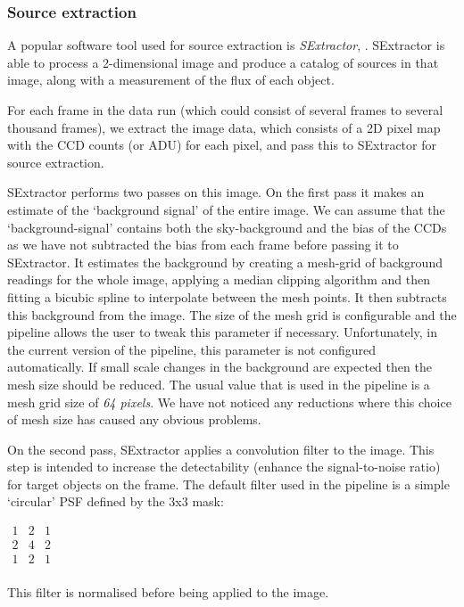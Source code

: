 \subsubsection{Source extraction}
A popular software tool used for source extraction is \emph{SExtractor}, \citep{bertin}. SExtractor is able to process a 2-dimensional image and produce a catalog of sources in that image, along with a measurement of the flux of each object. 

For each frame in the data run (which could consist of several frames to several thousand frames), we extract the image data, which consists of a 2D pixel map with the CCD counts (or ADU) for each pixel, and pass this to SExtractor for source extraction. 

SExtractor performs two passes on this image. On the first pass it makes an estimate of the `background signal' of the entire image. We can assume that the `background-signal' contains both the sky-background and the bias of the CCDs as we have not subtracted the bias from each frame before passing it to SExtractor. It estimates the background by creating a mesh-grid of background readings for the whole image, applying a median clipping algorithm and then fitting a bicubic spline to interpolate between the mesh points. It then subtracts this background from the image. The size of the mesh grid is configurable and the pipeline allows the user to tweak this parameter if necessary. Unfortunately, in the current version of the pipeline, this parameter is not configured automatically.  If small scale changes in the background are expected then the mesh size should be reduced. The usual value that is used in the pipeline is a mesh grid size of \emph{64 pixels}. We have not noticed any reductions where this choice of mesh size has caused any obvious problems. 

On the second pass, SExtractor applies a convolution filter to the image. This step is intended to increase the detectability (enhance the signal-to-noise ratio) for target objects on the frame. The default filter used in the pipeline is a simple `circular' PSF defined by the 3x3 mask:

$
\begin{array}{ccc}
  1 & 2 & 1 \\
  2 & 4 & 2 \\
  1 & 2 & 1 \\
\end{array}  
$

This filter is normalised before being applied to the image.

